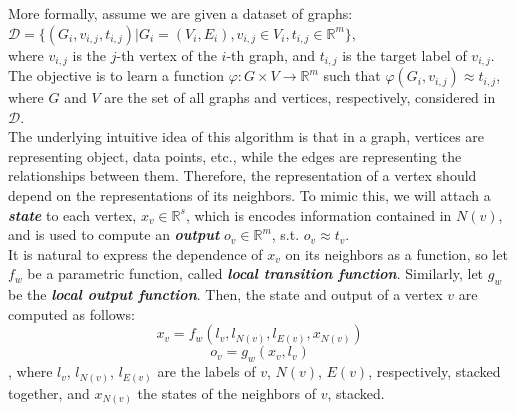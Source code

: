 \documentclass[12pt]{article}
\begin{document}
    More formally, assume we are given a dataset of graphs: \\ $\mathcal{D} = \{(G_i, v_{i, j}, t_{i, j}) | G_i = (V_i, E_i), v_{i, j} \in V_i, t_{i, j} \in \mathbb{R}^m\}$, \\
    where $v_{i, j}$ is the $j$-th vertex of the $i$-th graph, and $t_{i, j}$ is the target label of $v_{i, j}$.
    The objective is to learn a function $\varphi : G \times V \rightarrow \mathbb{R}^m$ such that $\varphi(G_i, v_{i, j}) \approx t_{i, j}$,
    where $G$ and $V$ are the set of all graphs and vertices, respectively, considered in $\mathcal{D}$.
    \\
    \indent The underlying intuitive idea of this algorithm is that in a graph, vertices are representing object, data points, etc.,
    while the edges are representing the relationships between them. Therefore, the representation of a vertex should depend on the
    representations of its neighbors. To mimic this, we will attach a \textbf{\textit{state}} to each vertex, 
    $x_v \in \mathbb{R}^s$, which is encodes information contained in $N(v)$, and is used to compute an 
    \textbf{\textit{output}} $o_v \in \mathbb{R}^m$, s.t. $o_v \approx t_v$.
    \\
    \indent It is natural to express the dependence of $x_v$ on its neighbors as a function, so let 
    $f_w$ be a parametric function, called \textbf{\textit{local transition function}}.
    Similarly, let $g_w$ be the \textbf{\textit{local output function}}. Then, the state and output of a vertex $v$ are computed as follows:
    \begin{equation}
        x_v = f_w(l_v, l_{N(v)}, l_{E(v)}, x_{N(v)})
    \end{equation}
    \begin{equation}
        o_v = g_w(x_v, l_v)
    \end{equation}
    , where $l_v$, $l_{N(v)}$, $l_{E(v)}$ are the labels of $v$, $N(v)$, $E(v)$, respectively, stacked together,
    and $x_{N(v)}$ the states of the neighbors of $v$, stacked.
\end{document}
